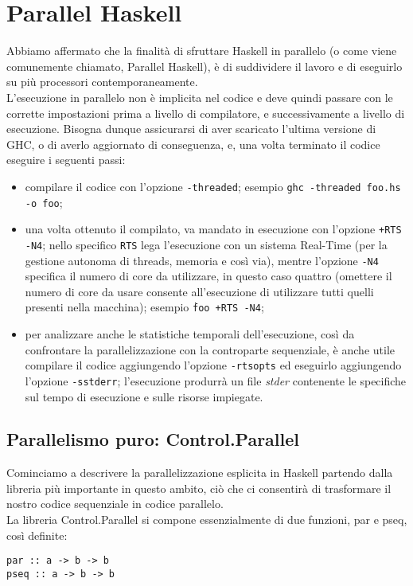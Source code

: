 \chapter{Parallel Haskell}
Abbiamo affermato che la finalità di sfruttare Haskell in parallelo (o come viene comunemente chiamato, Parallel Haskell), è di suddividere il lavoro e di eseguirlo su più processori contemporaneamente.\\
L'esecuzione in parallelo non è implicita nel codice e deve quindi passare con le corrette impostazioni prima a livello di compilatore, e successivamente a livello di esecuzione. Bisogna dunque assicurarsi di aver scaricato l'ultima versione di GHC, o di averlo aggiornato di conseguenza, e, una volta terminato il codice eseguire i seguenti passi:
\begin{itemize}
\item{compilare il codice con l'opzione \texttt{-threaded}; esempio \texttt{ghc -threaded foo.hs -o foo};}
\item{una volta ottenuto il compilato, va mandato in esecuzione con l'opzione \texttt{+RTS -N4}; nello specifico \texttt{RTS} lega l'esecuzione con un sistema Real-Time (per la gestione autonoma di threads, memoria e così via), mentre l'opzione \texttt{-N4} specifica il numero di core da utilizzare, in questo caso quattro (omettere il numero di core da usare consente all'esecuzione di utilizzare tutti quelli presenti nella macchina); esempio \texttt{\.foo +RTS -N4};}
\item{per analizzare anche le statistiche temporali dell'esecuzione, così da confrontare la parallelizzazione con la controparte sequenziale, è anche utile compilare il codice aggiungendo l'opzione \texttt{-rtsopts} ed eseguirlo aggiungendo l'opzione \texttt{-sstderr}; l'esecuzione produrrà un file \textit{stder} contenente le specifiche sul tempo di esecuzione e sulle risorse impiegate.}
\end{itemize}
\section{Parallelismo puro: Control.Parallel}
Cominciamo a descrivere la parallelizzazione esplicita in Haskell partendo dalla libreria più importante in questo ambito, ciò che ci consentirà di trasformare il nostro codice sequenziale in codice parallelo.\\
La libreria Control.Parallel si compone essenzialmente di due funzioni, par e pseq, così definite:
\begin{verbatim}
par :: a -> b -> b
pseq :: a -> b -> b
\end{verbatim}
